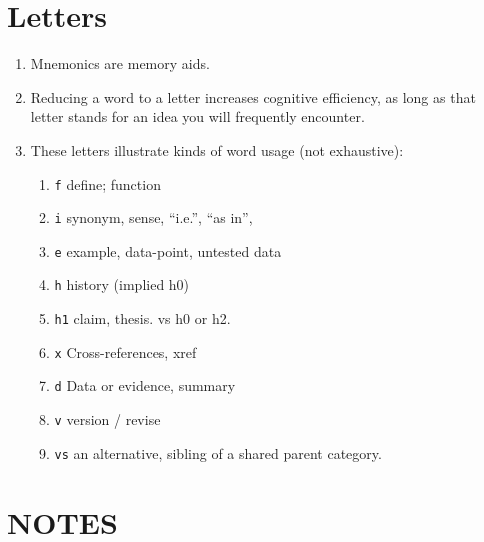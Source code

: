 \documentclass[
]{book}
\providecommand{\tightlist}{%
  \setlength{\itemsep}{0pt}\setlength{\parskip}{0pt}}
\begin{document}
\hypertarget{letters}{%
\section{Letters}\label{letters}}

\begin{enumerate}
\def\labelenumi{\arabic{enumi}.}
\tightlist
\item
  Mnemonics are memory aids.
\item
  Reducing a word to a letter increases cognitive efficiency, as long
  as that letter stands for an idea you will frequently encounter.
\item
  These letters illustrate kinds of word usage (not exhaustive):

  \begin{enumerate}
  \def\labelenumii{\arabic{enumii}.}
  \tightlist
  \item
    \texttt{f} define; function\\
  \item
    \texttt{i} synonym, sense, ``i.e.'', ``as in'',\\
  \item
    \texttt{e} example, data-point, untested data\\
  \item
    \texttt{h} history (implied h0)
  \item
    \texttt{h1} claim, thesis. vs h0 or h2.
  \item
    \texttt{x} Cross-references, xref\\
  \item
    \texttt{d} Data or evidence, summary
  \item
    \texttt{v} version / revise\\
  \item
    \texttt{vs} an alternative, sibling of a shared parent category.
  \end{enumerate}
\end{enumerate}

\hypertarget{notes}{%
\section{NOTES}\label{notes}}
\end{document}
